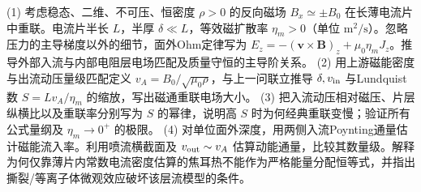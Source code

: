 (1) 考虑稳态、二维、不可压、恒密度 \(\rho>0\) 的反向磁场 \(B_x\simeq\pm B_0\) 在长薄电流片中重联。电流片半长 \(L\)，半厚 \(\delta\ll L\)，等效磁扩散率 \(\eta_m>0\)（单位 \(\mathrm{m^2/s}\)）。忽略压力的主导梯度以外的细节，面外Ohm定律写为 \(E_z=-({\boldsymbol v}\times{\boldsymbol B})_z+\mu_0\eta_mJ_z\)。推导外部入流与内部电阻层电场匹配及质量守恒的主导阶关系。
(2) 用上游磁能密度与出流动压量级匹配定义 \(v_A=B_0/\sqrt{\mu_0\rho}\)，与上一问联立推导 \(\delta, v_{\rm in}\) 与Lundquist数 \(S=Lv_A/\eta_m\) 的缩放，写出磁通重联电场大小。
(3) 把入流动压相对磁压、片层纵横比以及重联率分别写为 \(S\) 的幂律，说明高 \(S\) 时为何经典重联变慢；验证所有公式量纲及 \(\eta_m\to0^+\) 的极限。
(4) 对单位面外深度，用两侧入流Poynting通量估计磁能流入率。利用喷流横截面及 \(v_{\rm out}\sim v_A\) 估算动能通量，比较其数量级。解释为何仅靠薄片内常数电流密度估算的焦耳热不能作为严格能量分配恒等式，并指出撕裂/等离子体微观效应破坏该层流模型的条件。
